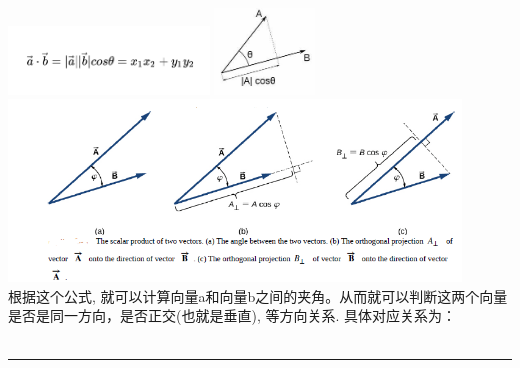 \documentclass[UTF8]{ctexart}
\begin{document}
\includegraphics[width=0.4\textwidth]{img/0097.png}
\includegraphics[width=0.2\textwidth]{img/0098.png} \\
\includegraphics[width=0.9\textwidth]{img/0099.png} \\

根据这个公式, 就可以计算向量a和向量b之间的夹角。从而就可以判断这两个向量是否是同一方向，是否正交(也就是垂直), 等方向关系. 具体对应关系为：\\

~\\
\hrule
~\\
\end{document}
